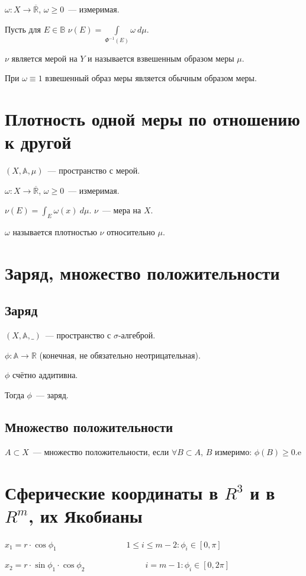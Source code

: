 \documentclass[paper=a4, fontsize=17pt]{article}
\begin{document}
	$\omega: X \to \overline{\mathds{R}}$, $\omega \geq 0$~--- измеримая.
	
	Пусть для $E \in \mathds{B}$ $\nu(E) = \int\limits_{\Phi^{-1}(E)} \omega~d\mu$.
	
	$\nu$ является мерой на $Y$ и называется взвешенным образом меры $\mu$.
	
	При $\omega \equiv 1$ взвешенный образ меры является обычным образом меры.
	
	\section{Плотность одной меры по отношению к другой}
	$(X, \mathds{A}, \mu)$~--- пространство с мерой.
	
	$\omega: X \to \overline{\mathds{R}}$, $\omega \geq 0$~--- измеримая.
	
	$\nu(E) = \int_E \omega(x)~d\mu$. $\nu$~--- мера на $X$.
	
	$\omega$ называется плотностью $\nu$ относительно $\mu$.
	
	\section{Заряд, множество положительности}
	\subsection{Заряд}
	$(X, \mathds{A}, \_)$~--- пространство с $\sigma$-алгеброй.
	
	$\phi: \mathds{A} \to \mathds{R}$ (конечная, не обязательно неотрицательная).
	
	$\phi$ счётно аддитивна.
	
	Тогда $\phi$~--- заряд.
	
	\subsection{Множество положительности}
	$A \subset X$~--- множество положительности, если
	$\forall B \subset A$, $B$ измеримо: $\phi(B) \geq 0$.e
	
	\section{Сферические координаты в $ R^3 $ и в $ R^m $, их Якобианы}
	$x_1 = r \cdot \cos \phi_1$
	$\ \ \ \ \ \ \ \ \ \ \ \ \ \ \ \ \ \ \ \ \ \ \ \ \ \ \ \ \ \ \ \ \ \ \ $ 
	$1 \leq i \leq m-2: \phi_i \in [0,\pi]$
	
	$x_2 = r \cdot \sin \phi_1 \cdot \cos \phi_2$
	$\ \ \ \ \ \ \ \ \ \ \ \ \ \ \ \ \ \ \ \ \ \ \ \ \ \ \ \ \ \ $
	$i=m-1: \phi_i \in [0,2\pi]$
	
\end{document}
